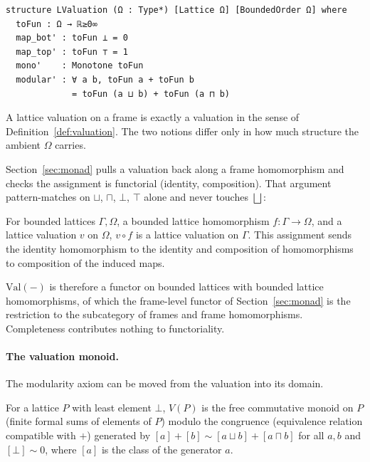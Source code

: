 \begin{lstlisting}
structure LValuation (Ω : Type*) [Lattice Ω] [BoundedOrder Ω] where
  toFun : Ω → ℝ≥0∞
  map_bot' : toFun ⊥ = 0
  map_top' : toFun ⊤ = 1
  mono'    : Monotone toFun
  modular' : ∀ a b, toFun a + toFun b
             = toFun (a ⊔ b) + toFun (a ⊓ b)
\end{lstlisting}

\noindent
A lattice valuation on a frame is exactly a valuation in the sense
of Definition~\ref{def:valuation}. The two notions differ only in
how much structure the ambient $\Omega$ carries.

Section~\ref{sec:monad} pulls a valuation back along a frame
homomorphism and checks the assignment is functorial (identity,
composition). That argument pattern-matches on $\sqcup$, $\sqcap$,
$\bot$, $\top$ alone and never touches $\bigsqcup$:

\begin{proposition}
\label{prop:lvaluation-comap}
For bounded lattices $\Gamma, \Omega$, a bounded lattice
homomorphism $f : \Gamma \to \Omega$, and a lattice valuation $v$ on
$\Omega$, $v \circ f$ is a lattice valuation on $\Gamma$. This
assignment sends the identity homomorphism to the identity and
composition of homomorphisms to composition of the induced maps.
\end{proposition}

\noindent
$\mathrm{Val}(-)$ is therefore a functor on bounded lattices with
bounded lattice homomorphisms, of which the frame-level functor of
Section~\ref{sec:monad} is the restriction to the subcategory of
frames and frame homomorphisms. Completeness contributes nothing to
functoriality.

\paragraph{The valuation monoid.}
The modularity axiom can be moved from the valuation into its domain.

\begin{definition}
\label{def:vmonoid}
For a lattice $P$ with least element $\bot$, $V(P)$ is the free
commutative monoid on $P$ (finite formal sums of elements of $P$)
modulo the congruence (equivalence relation compatible with $+$)
generated by
$[a] + [b] \sim [a \sqcup b] + [a \sqcap b]$ for all $a, b$ and
$[\bot] \sim 0$, where $[a]$ is the class of the generator $a$.
\end{definition}

